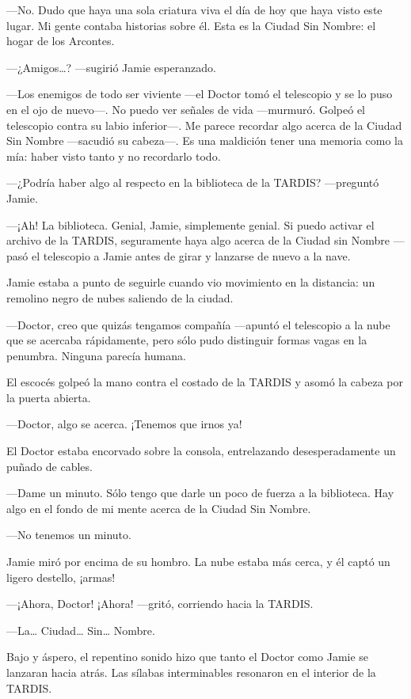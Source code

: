 ---No. Dudo que haya una sola criatura viva el día de hoy que haya visto
este lugar. Mi gente contaba historias sobre él. Esta es la Ciudad Sin
Nombre: el hogar de los Arcontes.

---¿Amigos\ldots{}? ---sugirió Jamie esperanzado.

---Los enemigos de todo ser viviente ---el Doctor tomó el telescopio y
se lo puso en el ojo de nuevo---. No puedo ver señales de
vida ---murmuró. Golpeó el telescopio contra su labio inferior---. Me
parece recordar algo acerca de la Ciudad Sin Nombre ---sacudió su
cabeza---. Es una maldición tener una memoria como la mía: haber visto
tanto y no recordarlo todo.

---¿Podría haber algo al respecto en la biblioteca de la
TARDIS? ---preguntó Jamie.

---¡Ah! La biblioteca. Genial, Jamie, simplemente genial. Si puedo
activar el archivo de la TARDIS, seguramente haya algo acerca de la
Ciudad sin Nombre ---pasó el telescopio a Jamie antes de girar y
lanzarse de nuevo a la nave.

Jamie estaba a punto de seguirle cuando vio movimiento en la distancia:
un remolino negro de nubes saliendo de la ciudad.~

---Doctor, creo que quizás tengamos compañía ---apuntó el telescopio a
la nube que se acercaba rápidamente, pero sólo pudo distinguir formas
vagas en la penumbra. Ninguna parecía humana.

El escocés golpeó la mano contra el costado de la TARDIS y asomó la
cabeza por la puerta abierta.~

---Doctor, algo se acerca. ¡Tenemos que irnos ya!

El Doctor estaba encorvado sobre la consola, entrelazando
desesperadamente un puñado de cables.~

---Dame un minuto. Sólo tengo que darle un poco de fuerza a la
biblioteca. Hay algo en el fondo de mi mente acerca de la Ciudad Sin
Nombre.

---No tenemos un minuto.

Jamie miró por encima de su hombro. La nube estaba más cerca, y él captó
un ligero destello, ¡armas!

---¡Ahora, Doctor! ¡Ahora! ---gritó, corriendo hacia la TARDIS.

---La\ldots{} Ciudad\ldots{} Sin\ldots{} Nombre.

Bajo y áspero, el repentino sonido hizo que tanto el Doctor como Jamie
se lanzaran hacia atrás. Las sílabas interminables resonaron en el
interior de la TARDIS.

